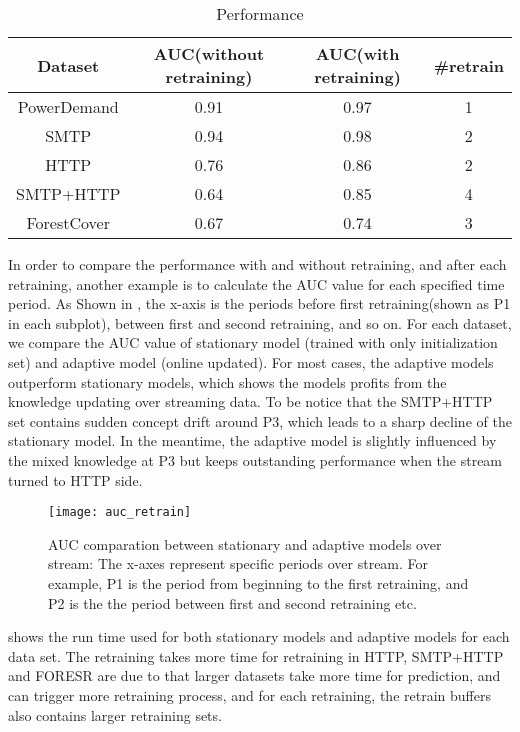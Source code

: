 \begin{table}[h] 
\caption{Performance} 
\centering      
\begin{tabular}{c | c | c | c}  
\hline  
Dataset & AUC(without retraining) & AUC(with retraining) & \#retrain \\ 
\hline 
PowerDemand & 0.91 & 0.97 & 1  \\  
\hline 
SMTP & 0.94 &  0.98 &  2 \\ 
\hline 
HTTP & 0.76 &  0.86 &  2 \\ 
\hline
SMTP+HTTP & 0.64 & 0.85 & 4 \\
\hline 
ForestCover &0.67&0.74 & 3\\   
\hline    
\end{tabular}
\label{tab:performance}  
\end{table} 
In order to compare the performance with and without retraining, and after each retraining, another example is to calculate the AUC value for each specified time period. As Shown in , the x-axis is the periods before first retraining(shown as P1 in each subplot), between first and second retraining, and so on. For each dataset, we compare the AUC value of stationary model (trained with only initialization set) and adaptive model (online updated). For most cases, the adaptive models outperform stationary models, which shows the models profits from the knowledge updating over streaming data. To be notice that the SMTP+HTTP set contains sudden concept drift around P3, which leads to a sharp decline of the stationary model. In the meantime, the adaptive model is slightly influenced by the mixed knowledge at P3 but keeps outstanding performance when the stream turned to HTTP side.\\
\begin{figure}[h]
\centering
\texttt{[image: auc\_retrain]}
\caption[AUC comparation between stationary and adaptive models over stream]{AUC comparation between stationary and adaptive models over stream: The x-axes represent specific periods over stream. For example, P1 is the period from beginning to the first retraining, and P2 is the the period between first and second retraining etc.}
\label{fig:auc_retrain}
\end{figure}

 shows the run time used for both stationary models and adaptive models for each data set. The retraining takes more time for retraining in HTTP, SMTP+HTTP and FORESR are due to that larger datasets take more time for prediction, and can trigger more retraining process, and for each retraining, the retrain buffers also contains larger retraining sets.



